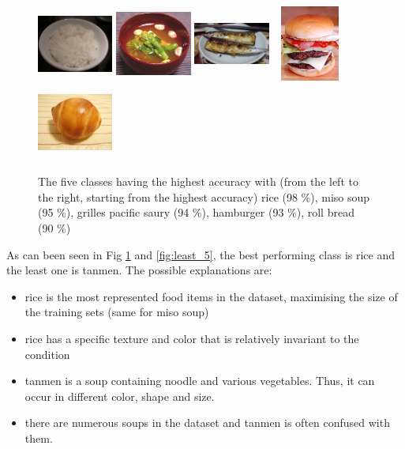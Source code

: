 \begin{figure}
    \centering
    \includegraphics[height=2.5cm, width=2.5cm]{img/top_rice.jpg}
    \includegraphics[height=2.5cm, width=2.5cm]{img/top_miso_soup.jpg}
    \includegraphics[height=2.5cm, width=2.5cm]{img/top_grilled_pacific_saury.jpg}
    \includegraphics[height=2.5cm, width=2.5cm]{img/top_hamburger.jpg}
    \includegraphics[height=2.5cm, width=2.5cm]{img/top_roll_bread.jpg}
    \caption[Classes having the highest accuracy]{The five classes having the highest accuracy with (from the left to the right, starting from the highest accuracy) rice (98 \%), miso soup (95 \%), grilles pacific saury (94 \%), hamburger (93 \%), roll bread (90 \%)}
    \label{fig:top_5}
\end{figure}

As can been seen in Fig \ref{fig:top_5} and \ref{fig:least_5}, the best performing class is rice and the least one is tanmen. The possible explanations are:
\begin{itemize}
    \item rice is the most represented food items in the dataset, maximising the size of the training sets (same for miso soup)
    \item rice has a specific texture and color that is relatively invariant to the condition
    \item tanmen is a soup containing noodle and various vegetables. Thus, it can occur in different color, shape and size.
    \item there are numerous soups in the dataset and tanmen is often confused with them.
\end{itemize}

